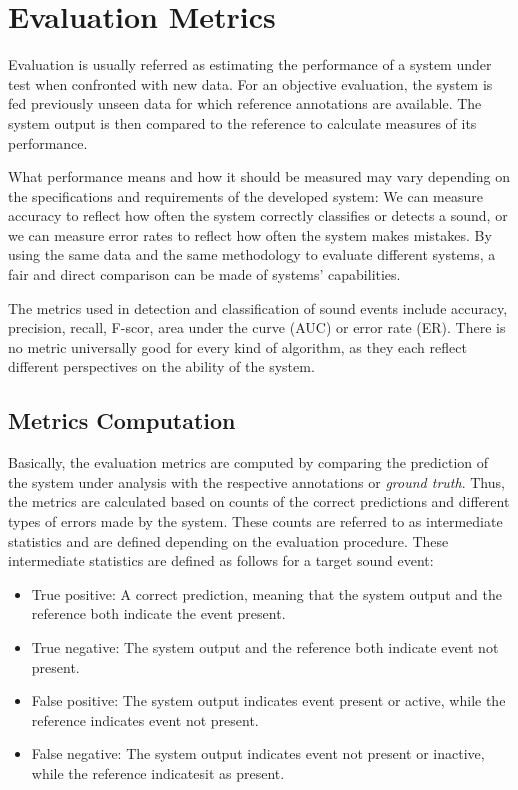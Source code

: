 \section{Evaluation Metrics}
\label{sec:evaluation_metrics}
Evaluation is usually referred as estimating the performance of a system under test
when confronted with new data. For an objective evaluation, the system is fed
previously unseen data for which reference annotations are available. The system output is then compared to the reference to calculate measures of its performance.

What performance means and how it should be measured may vary depending
on the specifications and requirements of the developed system: We can measure
accuracy to reflect how often the system correctly classifies or detects a sound, or we can measure error rates to reflect how often the system makes mistakes. By using
the same data and the same methodology to evaluate different systems, a fair and direct comparison can be made of systems’ capabilities.

The metrics used in detection and classification of sound events include accuracy, precision, recall, F-scor, area under the curve (AUC) or error rate (ER). There is no metric universally good for every kind of algorithm, as they each reflect different perspectives on the ability of the system.

\subsection{Metrics Computation}
Basically, the evaluation metrics are computed by comparing the prediction of the system under analysis with the respective annotations or \textit{ground truth}. Thus, the metrics are calculated based on counts of the correct predictions and different types of errors made by the system.
These counts are referred to as intermediate statistics and are defined depending on the evaluation procedure. These intermediate statistics are defined as follows for a target sound event:

\begin{itemize}
	\item True positive: A correct prediction, meaning that the system output and the reference both indicate the event present.
	\item True negative: The system output and the reference both indicate event not present.
	\item False positive: The system output indicates event  present or active, while the reference indicates event not present.
	\item False negative: The system output indicates event not present or inactive, while the reference indicatesit as present.
\end{itemize}

